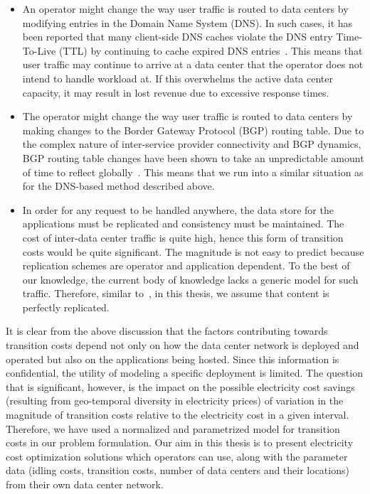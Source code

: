 \begin{itemize}
\item An operator might change the way user traffic is
    routed to data centers by modifying entries in the
    Domain Name System (DNS). In such cases, it has been
    reported that many client-side DNS caches violate the
    DNS entry Time-To-Live (TTL) by continuing to cache
    expired DNS entries~\cite{Pang_IMC_2004}. This means
    that user traffic may continue to arrive at a data
    center that the operator does not intend to handle
    workload at. If this overwhelms the active data center capacity, it may result in lost revenue due to excessive response times.
\item The operator might change the way user traffic is
    routed to data centers by making changes to the Border
    Gateway Protocol (BGP) routing table. Due to the
    complex nature of inter-service provider connectivity
    and BGP dynamics, BGP routing table changes have been
    shown to take an unpredictable amount of time to
    reflect globally~\cite{LabovitzSigcomm}. This means
    that we run into a similar situation as for the
    DNS-based method described above.
\item In order for any request to be handled anywhere, the
    data store for the applications must be replicated and
    consistency must be maintained.  The cost of inter-data center traffic is quite high, hence this form of transition costs would be quite significant. The magnitude is not easy to predict because replication schemes are operator and
    application dependent. To the best of our knowledge, the current body
of knowledge lacks a generic model for such traffic. Therefore, similar to~\cite{qureshi2009cutting}, in this thesis, we assume
that content is perfectly replicated.
\end{itemize}

It is clear from the above discussion that the factors contributing towards
transition costs depend not only on how the data center network
is deployed and operated but also on the applications being
hosted. Since this information is confidential, the utility of
modeling a specific deployment is limited. The question that is
significant, however, is the impact on the possible electricity
cost savings (resulting from geo-temporal diversity in
electricity prices) of variation in the magnitude of transition
costs relative to the electricity cost in a given interval. Therefore, we have used a normalized and parametrized model for transition costs in our problem formulation. Our aim in this thesis is to present
electricity cost optimization solutions which operators can
use, along with the parameter data (idling costs, transition
costs, number of data centers and their locations) from their
own data center network.

